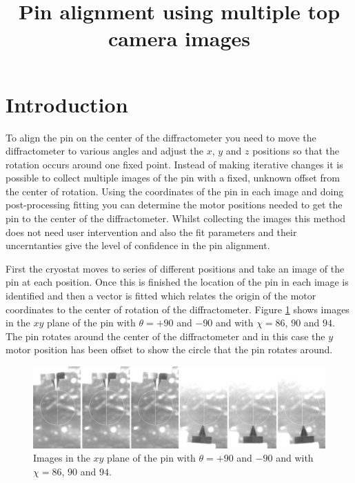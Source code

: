 \documentclass[a4paper,12pt]{article}
\date{}
\begin{document}
\title{Pin alignment using multiple top camera images}
\maketitle



\section{Introduction}

To align the pin on the center of the diffractometer you need to move the diffractometer to various angles and adjust the $x$, $y$ and $z$ positions so that the rotation occurs around one fixed point. Instead of making iterative changes it is possible to collect multiple images of the pin with a fixed, unknown offset from the center of rotation. Using the coordinates of the pin in each image and doing post-processing fitting you can determine the motor positions needed to get the pin to the center of the diffractometer. Whilst collecting the images this method does not need user intervention and also the fit parameters and their uncerntanties give the level of confidence in the pin alignment. 




First the cryostat moves to series of different positions and take an image of the pin at each position. Once this is finished the location of the pin in each image is identified and then a vector is fitted which relates the origin of the motor coordinates to the center of rotation of the diffractometer. Figure \ref{images_top} shows images in the $xy$ plane of the pin with $\theta = +90$ and $-90$ and with $\chi = 86$, $90$ and $94$. The pin rotates around the center of the diffractometer and in this case the $y$ motor position has been offset to show the circle that the pin rotates around. 

\begin{figure}[tbh]
	\centering
	\includegraphics[width=17cm]{graphics/images_top.jpg}
	\caption{Images in the $xy$ plane of the pin with $\theta = +90$ and $-90$ and with $\chi = 86$, $90$ and $94$.}
	\label{images_top}
\end{figure}
\end{document}
